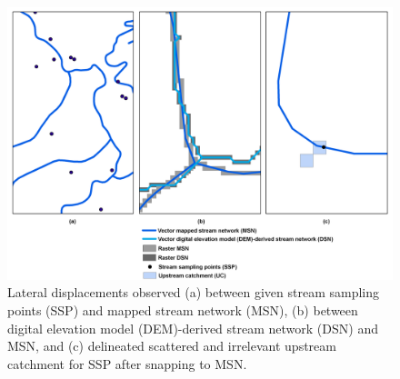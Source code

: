 \begin{landscape}

\begin{figure}[h!]
  \centering
  \vspace{-1.3cm} \includegraphics[width=0.9\linewidth]{Figures/Fig_S1_3.png}
  \caption{Lateral displacements observed (a) between given stream sampling points (SSP) and mapped stream network (MSN), (b) between digital elevation model (DEM)-derived  stream network (DSN) and MSN, and (c) delineated scattered and irrelevant upstream catchment for SSP after snapping to MSN.}
  \label{Fig_A_3}
\end{figure}

\end{landscape}